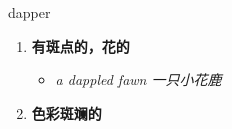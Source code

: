 
\begin{frame}
{\huge dapper}
\begin{center}
\begin{enumerate}\Large
  \item \textbf{有斑点的，花的}
  \begin{itemize}
    \item \em{\Large{a dappled fawn 一只小花鹿}}
  \end{itemize}
  \item \textbf{色彩斑斓的}
\end{enumerate}
\end{center}
\end{frame}
